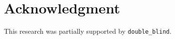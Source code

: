 \documentclass[sigconf]{acmart}
\begin{document}


% 

%



% 



\section*{Acknowledgment}
This research was partially supported by \texttt{double\_blind}.




\end{document}

